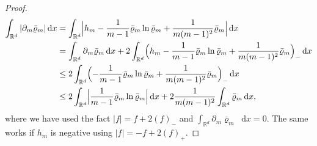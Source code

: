 \documentclass[11pt]{article}
\numberwithin{equation}{section}
\newcommand{\dx}[1]{\mathop{}\!\mathrm{d} #1}
\newcommand{\R}{\mathbb{R}}
\theoremstyle{plain}
\theoremstyle{remark}
\begin{document}
\begin{proof}
\begin{equation}\label{dmrho}
\begin{split} \int_{\R^d} |\partial_m \bar\varrho_m| \dx x &= \int_{\R^d} \Bigl |h_m - \frac{1}{m-1}\bar\varrho_m \ln \bar\varrho_m + \frac{1}{m(m-1)^2}\bar\varrho_m \Bigr| \dx x\\
&= \int_{\R^d}\partial_m \bar\varrho_m \dx x + 2\int_{\R^d} \Bigl(h_m - \frac{1}{m-1}\bar\varrho_m \ln \bar\varrho_m + \frac{1}{m(m-1)^2}\bar\varrho_m \Bigr)_- \dx x \\
&\leq 2 \int_{\R^d} \Bigl(- \frac{1}{m-1}\bar\varrho_m \ln \bar\varrho_m + \frac{1}{m(m-1)^2}\bar\varrho_m \Bigr)_- \dx x \\
&\leq 2 \int_{\R^d} \Bigl|\frac{1}{m-1}\bar\varrho_m \ln \bar\varrho_m \Bigr| \dx x + 2 \frac{1}{m(m-1)^2}\int_{\R^d}\bar\varrho_m \dx x,
\end{split}
\end{equation}
where we have used the fact $|f| = f + 2 (f)_-$ and $\int_{\R^d}\partial_m \bar\varrho_m \dx x=0$. The same works if $h_m$ is negative using $|f|=-f +2 (f)_+$.


\end{proof}
\end{document}
